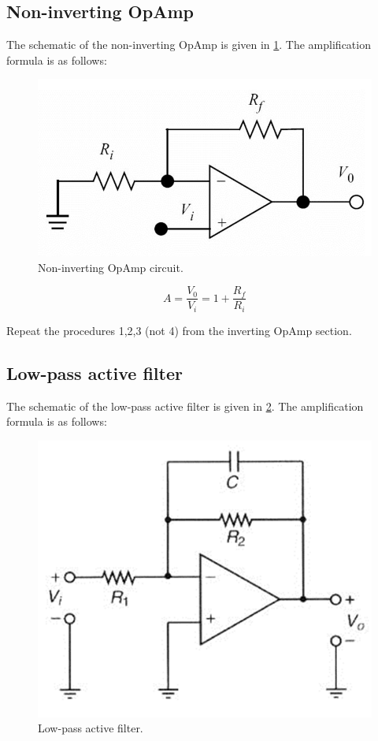 \documentclass[11pt,letterpaper]{article}
\begin{document}
\subsection{Non-inverting OpAmp}
The schematic of the non-inverting OpAmp is given in \ref{fig:Lab5_NonInvertingOpAmp}. The amplification formula is as follows:

\begin{figure}
\centering
\includegraphics[width=0.6\linewidth]{Lab5_NonInvertingOpAmp}
\caption{Non-inverting OpAmp circuit.}
\label{fig:Lab5_NonInvertingOpAmp}
\end{figure}

\begin{equation} \label{Eqn:OpAmpsPassiveFilters2}
A = \dfrac{V_0}{V_i} = 1+ \dfrac{R_f}{R_i}
\end{equation}

Repeat the procedures 1,2,3 (not 4) from the inverting OpAmp section.

\subsection{Low-pass active filter}

The schematic of the low-pass active filter is given in \ref{fig:Lab5_LowPassActiveFilter}. The amplification formula is as follows:

\begin{figure}
\centering
\includegraphics[width=0.6\linewidth]{Lab5_LowPassActiveFilter}
\caption{Low-pass active filter.}
\label{fig:Lab5_LowPassActiveFilter}
\end{figure}
\end{document}
